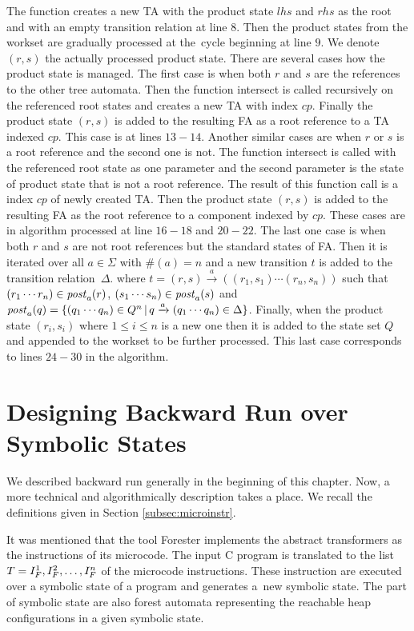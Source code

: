 The function creates a new TA with the product state $lhs$ and $rhs$ as the root
and with an empty transition relation at line $8$.
Then the product states from the workset are gradually processed at the~cycle beginning
at line $9$.
We denote $(r,s)$ the actually processed product state.
There are several cases how the product state is managed.
The first case is when both $r$ and $s$ are the references
to the other tree automata.
Then the function intersect is called recursively on the referenced
root states and creates a new TA with index $cp$.
Finally the product state $(r,s)$ is added to the resulting FA
as a root reference to a TA indexed $cp$.
This case is at lines $13-14$.
Another similar cases are when $r$ or $s$ is a root reference and the second one is not.
The function intersect is called with the referenced root state as one parameter
and the second parameter is the state of product state that is not a root reference.
The result of this function call is a index $cp$ of newly created TA.
Then the product state $(r,s)$ is added to the resulting FA as the root reference
to a component indexed by $cp$.
These cases are in algorithm processed at line $16-18$ and $20-22$.
The last one case is when both $r$ and $s$ are not root references
but the standard states of FA.
Then it is iterated over all $a \in \Sigma$ with $\#(a) = n$
and a new transition $t$ is added to the transition relation~$\Delta$.
where $t = (r,s) \xrightarrow{a} ((r_1,s_1) \cdots (r_n, s_n))$ such that
$(r_1 \cdots r_n) \in \mathit{post}_{a}(r)$, $(s_1 \cdots s_n) \in \mathit{post}_{a}(s)$ and
$\mathit{post}_{a}(q) = \{(q_1 \cdots q_n) \in Q^n\,|\, q \xrightarrow{a} (q_1 \cdots q_n) \in \Delta\}$.
Finally, when the product state $(r_i,s_i)$ where $1 \leq i \leq n$ is a new one
then it is added to the state set $Q$ and appended to the workset to be further processed.
This last case corresponds to lines $24-30$ in the algorithm.



\section{Designing Backward Run over Symbolic States}
\label{sec:brdesign}

We described backward run generally in the beginning of this chapter.
Now, a more technical and algorithmically description takes a place.
We recall the definitions given in Section \ref{subsec:microinstr}.

It was mentioned that the tool Forester implements the abstract
transformers as the instructions of its microcode.
The input C program is translated to the list $T=I^{1}_{F}, I^{2}_{F},\ldots, I^{n}_{F}$
of the microcode instructions.
These instruction are executed over a symbolic state of a program
and generates a~new symbolic state.
The part of symbolic state are also forest automata representing
the reachable heap configurations in a given symbolic state.

